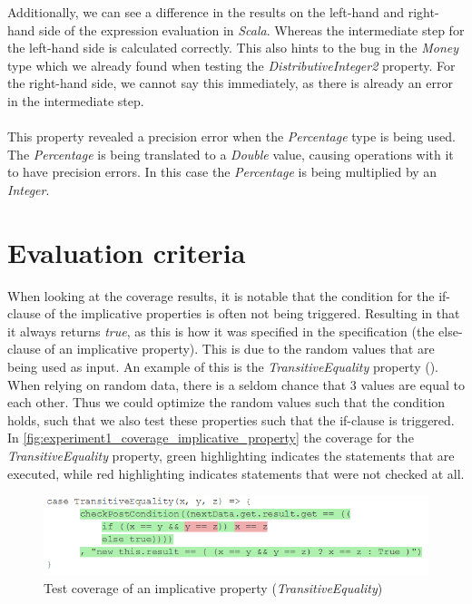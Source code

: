 \FloatBarrier
Additionally, we can see a difference in the results on the left-hand and
right-hand side of the expression evaluation in \textit{Scala}. Whereas the
intermediate step for the left-hand side is calculated correctly. This also hints to
the bug in the \textit{Money} type which we already found when testing the
\textit{DistributiveInteger2} property. For the right-hand side, we cannot say
this immediately, as there is already an error in the intermediate step.\\
\\
This property revealed a precision error when the \textit{Percentage} type is
being used. The \textit{Percentage} is being translated to a \textit{Double}
value, causing operations with it to have precision errors. In this case the
\textit{Percentage} is being multiplied by an \textit{Integer}.

\section{Evaluation criteria}

When looking at the coverage results, it is notable that the
condition for the if-clause of the implicative properties is often not being
triggered. Resulting in that it always returns \textit{true}, as this is how it
was specified in the specification (the else-clause of an implicative property).
This is due to the random values that are being used as input. An example of
this is the \textit{TransitiveEquality} property
(). When relying on random data,
there is a seldom chance that 3 values are equal to each other. Thus we could
optimize the random values such that the condition holds, such that we also test
these properties such that the if-clause is triggered. In
\autoref{fig:experiment1_coverage_implicative_property} the coverage for the
\textit{TransitiveEquality} property, green highlighting indicates the
statements that are executed, while red highlighting indicates statements that
were not checked at all.
\FloatBarrier
\begin{figure}[!ht]
	\includegraphics[width=\linewidth]{figures/experiment1_coverage_implicative_property}
\caption{Test coverage of an implicative property (\textit{TransitiveEquality})}
\label{fig:experiment1_coverage_implicative_property}
\centering
\end{figure}
\FloatBarrier

